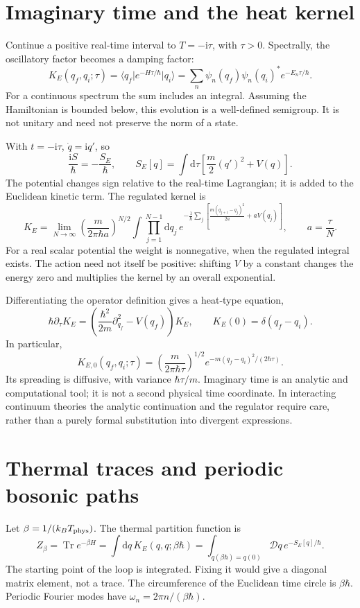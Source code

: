 \documentclass[11pt]{article}
\newcommand{\dd}{\mathrm d}
\newcommand{\ii}{\mathrm i}
\newcommand{\Tr}{\operatorname{Tr}}
\newcommand{\D}{\mathcal D}
\newcommand{\ket}[1]{\lvert#1\rangle}
\newcommand{\bra}[1]{\langle#1\rvert}
\newcommand{\module}[1]{\clearpage\section{#1}}
\begin{document}
\module{Imaginary time and the heat kernel}
Continue a positive real-time interval to \(T=-\ii\tau\), with
\(\tau>0\). Spectrally, the oscillatory factor becomes a damping factor:
\begin{equation}
 K_E(q_f,q_i;\tau)=\bra{q_f}e^{-H\tau/\hbar}\ket{q_i}
 =\sum_n\psi_n(q_f)\psi_n(q_i)^*e^{-E_n\tau/\hbar}.  \label{eq:spectral}
\end{equation}
For a continuous spectrum the sum includes an integral. Assuming the
Hamiltonian is bounded below, this evolution is a well-defined
semigroup. It is not unitary and need not preserve the norm of a state.

With \(t=-\ii\tau\), \(\dot q=\ii q'\), so
\begin{equation}
 \frac{\ii S}{\hbar}=-\frac{S_E}{\hbar},\qquad
 S_E[q]=\int\dd\tau\left[\frac m2(q')^2+V(q)\right].
                                                        \label{eq:euclaction}
\end{equation}
The potential changes sign relative to the real-time Lagrangian;
it is added to the Euclidean kinetic term. The regulated kernel is
\begin{equation}
 K_E=\lim_{N\to\infty}\left(\frac{m}{2\pi\hbar a}\right)^{N/2}
 \int\prod_{j=1}^{N-1}\dd q_j\,
 e^{-\frac1\hbar\sum_j[\frac{m(q_{j+1}-q_j)^2}{2a}+aV(q_j)]},
 \qquad a=\frac{\tau}{N}.
\end{equation}
For a real scalar potential the weight is nonnegative, when the
regulated integral exists. The action need not itself be positive:
shifting \(V\) by a constant changes the energy zero and multiplies
the kernel by an overall exponential.

Differentiating the operator definition gives a heat-type equation,
\begin{equation}
 \hbar\partial_\tau K_E
 =\left(\frac{\hbar^2}{2m}\partial_{q_f}^2-V(q_f)\right)K_E,
 \qquad K_E(0)=\delta(q_f-q_i).
\end{equation}
In particular,
\begin{equation}
 K_{E,0}(q_f,q_i;\tau)
 =\left(\frac{m}{2\pi\hbar\tau}\right)^{1/2}
 e^{-m(q_f-q_i)^2/(2\hbar\tau)}.
\end{equation}
Its spreading is diffusive, with variance \(\hbar\tau/m\). Imaginary
time is an analytic and computational tool; it is not a second
physical time coordinate. In interacting continuum theories the
analytic continuation and the regulator require care, rather than a
purely formal substitution into divergent expressions.

\module{Thermal traces and periodic bosonic paths}
Let \(\beta=1/(k_BT_{\rm phys})\). The thermal partition function is
\begin{equation}
 Z_\beta=\Tr e^{-\beta H}
 =\int\dd q\,K_E(q,q;\beta\hbar)
 =\int_{q(\beta\hbar)=q(0)}\D q\,e^{-S_E[q]/\hbar}.  \label{eq:thermal}
\end{equation}
The starting point of the loop is integrated. Fixing it would give a
diagonal matrix element, not a trace. The circumference of the
Euclidean time circle is \(\beta\hbar\). Periodic Fourier modes have
\(\omega_n=2\pi n/(\beta\hbar)\).
\end{document}
